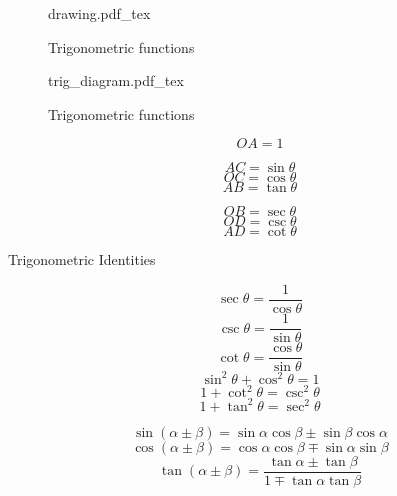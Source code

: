 \documentclass[17pt]{memoir}
\newcommand{\incfig}[1]{%
    \def\svgwidth{\columnwidth}
    {#1.pdf_tex}
}
\begin{document}

\begin{figure}[ht]
    \centering
    \incfig{drawing}
    \caption{Trigonometric functions}
    \label{fig:trig-functions}
\end{figure}

\begin{figure}[ht]
    \centering
    \incfig{trig_diagram}
    \caption{Trigonometric functions}
    \label{fig:trig-functions}
\end{figure}




\[ OA = 1 \]

\begin{multicols}{2}

\[ AC = \sin{\theta} \]
\[ OC = \cos{\theta} \]
\[ AB = \tan{\theta} \]

\columnbreak

\[ OB = \sec{\theta} \]
\[ OD = \csc{\theta} \]
\[ AD = \cot{\theta} \]

\end{multicols}

\newpage
\large

\begin{center}
Trigonometric Identities
\end{center}

\begin{multicols}{2}

{
\[ \sec{\theta} = \frac{1}{\cos{\theta}} \]
\[ \csc{\theta} = \frac{1}{\sin{\theta}} \]
\[ \cot{\theta} = \frac{\cos{\theta}}{\sin{\theta}} \]
}
{
\[ \sin^{2}\theta + \cos^{2}\theta = 1\]
\[ 1 + \cot^2 \theta = \csc^2 \theta \]
\[ 1 + \tan^2 \theta = \sec^2 \theta \]
}

\end{multicols}

\[ \sin(\alpha \pm \beta) = \sin\alpha \cos\beta \pm \sin\beta \cos\alpha \]
\[ \cos(\alpha \pm \beta) = \cos\alpha \cos\beta \mp \sin\alpha \sin\beta \]
\[ \tan(\alpha \pm \beta) = \frac{\tan \alpha \pm \tan \beta}{1 \mp \tan \alpha \tan \beta} \]
\end{document}
